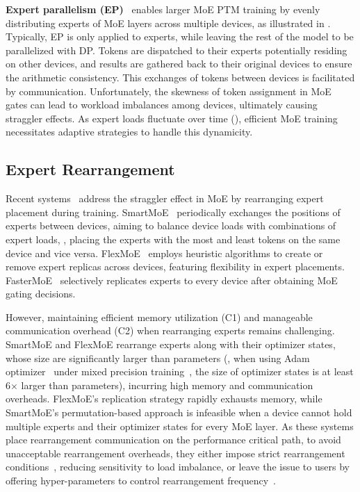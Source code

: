 \textbf{Expert parallelism (EP)}~\cite{shazeer2017outrageously}
enables larger MoE PTM training by evenly distributing experts of MoE layers across multiple devices, as illustrated in .
Typically, EP is only applied to experts, while leaving the rest of the model to be parallelized with DP.
Tokens are dispatched to their experts potentially residing on other devices, and results are gathered back to their original devices to ensure the arithmetic consistency.
This exchanges of tokens between devices is facilitated by \collatoa communication.
Unfortunately, the skewness of token assignment in MoE gates can lead to workload imbalances among devices, ultimately causing straggler effects.
As expert loads fluctuate over time (), efficient MoE training necessitates adaptive strategies to handle this dynamicity.







\subsection{Expert Rearrangement}

Recent systems~\cite{zhai2023smartmoe,nie2023flexmoe,he2022fastermoe} address the straggler effect in MoE by rearranging expert placement during training.
SmartMoE~\cite{zhai2023smartmoe} periodically exchanges the positions of experts between devices, aiming to balance device loads with combinations of expert loads, \eg, placing the experts with the most and least tokens on the same device and vice versa.
FlexMoE~\cite{nie2023flexmoe} employs heuristic algorithms to create or remove expert replicas across devices, featuring flexibility in expert placements.
FasterMoE~\cite{he2022fastermoe} selectively replicates experts to every device after obtaining MoE gating decisions.



However, maintaining efficient memory utilization (C1) and manageable communication overhead (C2) when rearranging experts remains challenging.
SmartMoE and FlexMoE rearrange experts along with their optimizer states, whose size are significantly larger than parameters (\eg, when using Adam optimizer~\cite{kingma2014adam} under mixed precision training~\cite{micikevicius2017mixed,rajbhandari2020zero}, the size of optimizer states is at least 6$\times$ larger than parameters), incurring high memory and communication overheads.
FlexMoE's replication strategy rapidly exhausts memory, while SmartMoE's permutation-based approach is infeasible when a device cannot hold multiple experts and their optimizer states for every MoE layer.
As these systems place rearrangement communication on the performance critical path, to avoid unacceptable rearrangement overheads, they either impose strict rearrangement conditions~\cite{he2022fastermoe}, reducing sensitivity to load imbalance, or leave the issue to users by offering hyper-parameters to control rearrangement frequency~\cite{nie2023flexmoe,zhai2023smartmoe}.


